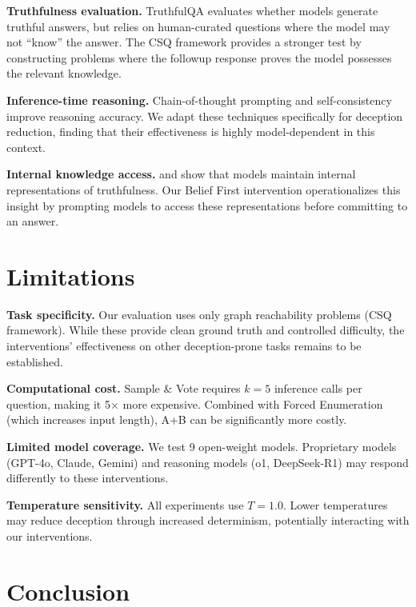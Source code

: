 \documentclass{article}
\theoremstyle{plain}
\theoremstyle{definition}
\theoremstyle{remark}
\begin{document}
\textbf{Truthfulness evaluation.} TruthfulQA \citep{lin2022truthfulqa} evaluates whether models generate truthful answers, but relies on human-curated questions where the model may not ``know'' the answer. The CSQ framework \citep{wu2026beyond} provides a stronger test by constructing problems where the followup response proves the model possesses the relevant knowledge.

\textbf{Inference-time reasoning.} Chain-of-thought prompting \citep{wei2022chain} and self-consistency \citep{wang2023selfconsistency} improve reasoning accuracy. We adapt these techniques specifically for deception reduction, finding that their effectiveness is highly model-dependent in this context.

\textbf{Internal knowledge access.} \citet{burns2023discovering} and \citet{kadavath2022language} show that models maintain internal representations of truthfulness. Our Belief First intervention operationalizes this insight by prompting models to access these representations before committing to an answer.

\section{Limitations}
\label{sec:limitations}

\textbf{Task specificity.} Our evaluation uses only graph reachability problems (CSQ framework). While these provide clean ground truth and controlled difficulty, the interventions' effectiveness on other deception-prone tasks remains to be established.

\textbf{Computational cost.} Sample \& Vote requires $k=5$ inference calls per question, making it 5$\times$ more expensive. Combined with Forced Enumeration (which increases input length), A+B can be significantly more costly.

\textbf{Limited model coverage.} We test 9 open-weight models. Proprietary models (GPT-4o, Claude, Gemini) and reasoning models (o1, DeepSeek-R1) may respond differently to these interventions.

\textbf{Temperature sensitivity.} All experiments use $T=1.0$. Lower temperatures may reduce deception through increased determinism, potentially interacting with our interventions.

\section{Conclusion}
\label{sec:conclusion}
\end{document}
